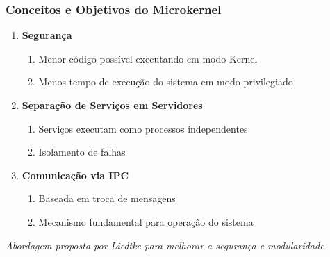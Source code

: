 \documentclass{beamer}
\begin{document}
\begin{frame}[fragile]
\frametitle{Conceitos e Objetivos do Microkernel}

\begin{enumerate}\small
    \item \textbf{Segurança}
    \begin{enumerate}\footnotesize
        \item Menor código possível executando em modo Kernel
        \item Menos tempo de execução do sistema em modo privilegiado
    \end{enumerate}
    
    \vfill
    \item \textbf{Separação de Serviços em Servidores}
    \begin{enumerate}\footnotesize
        \item Serviços executam como processos independentes
        \item Isolamento de falhas
    \end{enumerate}
    
    \vfill
    \item \textbf{Comunicação via IPC}
    \begin{enumerate}\footnotesize
        \item Baseada em troca de mensagens
        \item Mecanismo fundamental para operação do sistema
    \end{enumerate}
\end{enumerate}

\vfill
\begin{center}
    \textit{Abordagem proposta por Liedtke \cite{liedtke1995micro} para melhorar a segurança e modularidade}
\end{center}
\end{frame}
\end{document}
